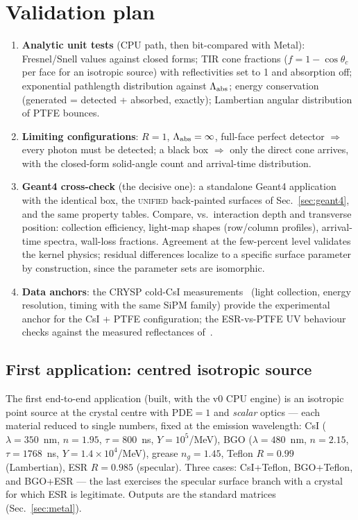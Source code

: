 \documentclass[11pt,a4paper]{article}
\newcommand{\csi}{CsI}
\newcommand{\bgo}{BGO}
\begin{document}
\section{Validation plan}
\label{sec:validation}

\begin{enumerate}
  \item \textbf{Analytic unit tests} (CPU path, then bit-compared with Metal):
    Fresnel/Snell values against closed forms; TIR cone fractions ($f = 1 - \cos\theta_c$
    per face for an isotropic source) with reflectivities set to 1 and absorption off;
    exponential pathlength distribution against $\Lambda_{\rm abs}$; energy conservation
    (generated = detected + absorbed, exactly); Lambertian angular distribution of PTFE
    bounces.
  \item \textbf{Limiting configurations}: $R=1$, $\Lambda_{\rm abs}=\infty$, full-face
    perfect detector $\Rightarrow$ every photon must be detected; a black box
    $\Rightarrow$ only the direct cone arrives, with the closed-form solid-angle count and
    arrival-time distribution.
  \item \textbf{Geant4 cross-check} (the decisive one): a standalone Geant4 application with
    the identical box, the \textsc{unified} back-painted surfaces of
    Sec.~\ref{sec:geant4}, and the same property tables. Compare, vs.\ interaction depth
    and transverse position: collection efficiency, light-map shapes (row/column profiles),
    arrival-time spectra, wall-loss fractions. Agreement at the few-percent level validates
    the kernel physics; residual differences localize to a specific surface parameter by
    construction, since the parameter sets are isomorphic.
  \item \textbf{Data anchors}: the CRYSP cold-\csi{} measurements~\cite{soleti2024} (light
    collection, energy resolution, timing with the same SiPM family) provide the
    experimental anchor for the \csi{} + PTFE configuration; the ESR-vs-PTFE UV behaviour
    checks against the measured reflectances of~\cite{janecek2008}.
\end{enumerate}

\subsection{First application: centred isotropic source}
\label{sec:firstapp}

The first end-to-end application (built, with the v0 CPU engine) is an isotropic point
source at the crystal centre with $\mathrm{PDE}=1$ and \emph{scalar} optics --- each
material reduced to single numbers, fixed at the emission wavelength: \csi{}
($\lambda=350$~nm, $n=1.95$, $\tau=800$~ns, $Y=10^5$/MeV), \bgo{} ($\lambda=480$~nm,
$n=2.15$, $\tau=1768$~ns, $Y=1.4\times10^4$/MeV), grease $n_g=1.45$, Teflon
$R=0.99$ (Lambertian), ESR $R=0.985$ (specular). Three cases: \csi{}+Teflon,
\bgo{}+Teflon, and \bgo{}+ESR --- the last exercises the specular surface branch with a
crystal for which ESR is legitimate. Outputs are the standard matrices
(Sec.~\ref{sec:metal}).
\end{document}
